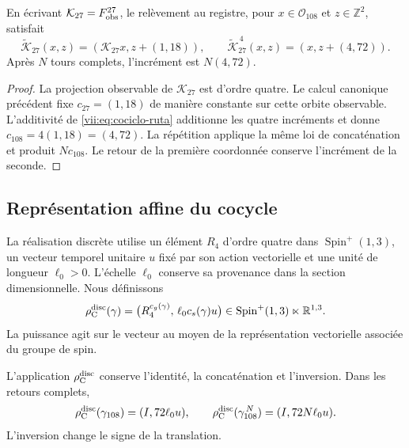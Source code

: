 \begin{proposition}
\label{vii:prop:memoria-vuelta-completa}
En écrivant \(\mathcal K_{27}=F_{\rm obs}^{27}\), le relèvement
au registre, pour \(x\in\mathcal O_{108}\) et \(z\in\mathbb Z^2\), satisfait
\[
 \widetilde{\mathcal K}_{27}(x,z)
   =(\mathcal K_{27}x,z+(1,18)),\qquad
 \widetilde{\mathcal K}_{27}^{\,4}(x,z)
   =(x,z+(4,72)).
\]
Après \(N\) tours complets, l'incrément est \(N(4,72)\).
\end{proposition}

\begin{proof}
La projection observable de \(\mathcal K_{27}\) est d'ordre quatre. Le calcul canonique précédent fixe \(c_{27}=(1,18)\) de manière constante sur cette orbite observable. L'additivité de \eqref{vii:eq:cociclo-ruta} additionne les quatre incréments et donne \(c_{108}=4(1,18)=(4,72)\). La répétition applique la même loi de concaténation et produit \(Nc_{108}\). Le retour de la première coordonnée conserve l'incrément de la seconde.
\end{proof}

\pagebreak %
\subsection{Représentation affine du cocycle}
\label{vii:subsec:representacion-afin-cociclo}

La réalisation discrète utilise un élément \(R_4\) d'ordre quatre dans
\(\operatorname{Spin}^+(1,3)\), un vecteur temporel unitaire \(u\)
fixé par son action vectorielle et une unité de longueur \(\ell_0>0\).
L'échelle \(\ell_0\) conserve sa provenance dans la section dimensionnelle.
Nous définissons
\begin{equation}
 \rho_{\rm C}^{\rm disc}(\gamma)=
 \bigl(R_4^{c_g(\gamma)},\,\ell_0c_s(\gamma)u\bigr)
 \in\operatorname{Spin}^+(1,3)\ltimes\mathbb R^{1,3}.
 \label{vii:eq:representacion-discreta-memoria}
\end{equation}
La puissance agit sur le vecteur au moyen de la représentation vectorielle
associée du groupe de spin.

\begin{theorem}
\label{vii:thm:traslacion-memoria}
L'application \(\rho_{\rm C}^{\rm disc}\) conserve l'identité,
la concaténation et l'inversion. Dans les retours complets,
\begin{equation}
 \rho_{\rm C}^{\rm disc}(\gamma_{108})=(I,72\ell_0u),\qquad
 \rho_{\rm C}^{\rm disc}(\gamma_{108}^{\,N})=(I,72N\ell_0u).
 \label{vii:eq:traslacion-retorno-108}
\end{equation}
L'inversion change le signe de la translation.
\end{theorem}

